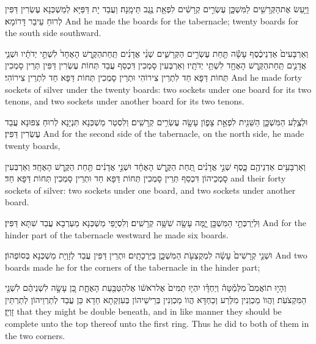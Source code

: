 {וַיַּ֥עַשׂ אֶת\maqqaf הַקְּרָשִׁ֖ים לַמִּשְׁכָּ֑ן עֶשְׂרִ֣ים קְרָשִׁ֔ים לִפְאַ֖ת נֶ֥גֶב תֵּימָֽנָה׃}
{וַעֲבַד יָת דַּפַּיָּא לְמַשְׁכְּנָא עֶשְׂרִין דַּפִּין לְרוּחַ עֵיבַר דָּרוֹמָא׃}
{And he made the boards for the tabernacle; twenty boards for the south side southward.}{}

{וְאַרְבָּעִים֙ אַדְנֵי\maqqaf כֶ֔סֶף עָשָׂ֕ה תַּ֖חַת עֶשְׂרִ֣ים הַקְּרָשִׁ֑ים שְׁנֵ֨י אֲדָנִ֜ים תַּֽחַת\maqqaf הַקֶּ֤רֶשׁ הָאֶחָד֙ לִשְׁתֵּ֣י יְדֹתָ֔יו וּשְׁנֵ֧י אֲדָנִ֛ים תַּֽחַת\maqqaf הַקֶּ֥רֶשׁ הָאֶחָ֖ד לִשְׁתֵּ֥י יְדֹתָֽיו׃}
{וְאַרְבְּעִין סָמְכִין דִּכְסַף עֲבַד תְּחוֹת עֶשְׂרִין דַּפִּין תְּרֵין סָמְכִין תְּחוֹת דַּפָּא חַד לִתְרֵין צִירוֹהִי וּתְרֵין סָמְכִין תְּחוֹת דַּפָּא חַד לִתְרֵין צִירוֹהִי׃}
{And he made forty sockets of silver under the twenty boards: two sockets under one board for its two tenons, and two sockets under another board for its two tenons.}{}

{וּלְצֶ֧לַע הַמִּשְׁכָּ֛ן הַשֵּׁנִ֖ית לִפְאַ֣ת צָפ֑וֹן עָשָׂ֖ה עֶשְׂרִ֥ים קְרָשִֽׁים׃}
{וְלִסְטַר מַשְׁכְּנָא תִּנְיָנָא לְרוּחַ צִפּוּנָא עֲבַד עֶשְׂרִין דַּפִּין׃}
{And for the second side of the tabernacle, on the north side, he made twenty boards,}{}

{וְאַרְבָּעִ֥ים אַדְנֵיהֶ֖ם כָּ֑סֶף שְׁנֵ֣י אֲדָנִ֗ים תַּ֚חַת הַקֶּ֣רֶשׁ הָאֶחָ֔ד וּשְׁנֵ֣י אֲדָנִ֔ים תַּ֖חַת הַקֶּ֥רֶשׁ הָאֶחָֽד׃}
{וְאַרְבְּעִין סָמְכֵיהוֹן דִּכְסַף תְּרֵין סָמְכִין תְּחוֹת דַּפָּא חַד וּתְרֵין סָמְכִין תְּחוֹת דַּפָּא חַד׃}
{and their forty sockets of silver: two sockets under one board, and two sockets under another board.}{}

{וּֽלְיַרְכְּתֵ֥י הַמִּשְׁכָּ֖ן יָ֑מָּה עָשָׂ֖ה שִׁשָּׁ֥ה קְרָשִֽׁים׃}
{וְלִסְיָפֵי מַשְׁכְּנָא מַעְרְבָא עֲבַד שִׁתָּא דַּפִּין׃}
{And for the hinder part of the tabernacle westward he made six boards.}{}

{וּשְׁנֵ֤י קְרָשִׁים֙ עָשָׂ֔ה לִמְקֻצְעֹ֖ת הַמִּשְׁכָּ֑ן בַּיַּרְכָתָֽיִם׃}
{וּתְרֵין דַּפִּין עֲבַד לְזָוְיָת מַשְׁכְּנָא בְּסוֹפְהוֹן׃}
{And two boards made he for the corners of the tabernacle in the hinder part;}{}

{וְהָי֣וּ תוֹאֲמִם֮ מִלְּמַ֒טָּה֒ וְיַחְדָּ֗ו יִהְי֤וּ תַמִּים֙ אֶל\maqqaf רֹאשׁ֔וֹ אֶל\maqqaf הַטַּבַּ֖עַת הָאֶחָ֑ת כֵּ֚ן עָשָׂ֣ה לִשְׁנֵיהֶ֔ם לִשְׁנֵ֖י הַמִּקְצֹעֹֽת׃}
{וַהֲווֹ מַכְוְנִין מִלְּרַע וְכַחְדָּא הֲווֹ מַכְוְנִין בְּרֵישֵׁיהוֹן בְּעִזְקְתָא חַדָא כֵּן עֲבַד לְתַרְוֵיהוֹן לְתַרְתֵּין זָוְיָן׃}
{that they might be double beneath, and in like manner they should be complete unto the top thereof unto the first ring. Thus he did to both of them in the two corners.}{}

